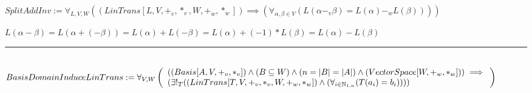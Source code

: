 \documentclass{book}
\newcommand{\abr}{:=}
\begin{document}
$SplitAddInv \abr \forall_{L, V, W}((LinTrans[L, V, +_v, *_v, W, +_w, *_w]) \implies (\forall_{\alpha, \beta \in V}(L(\alpha -_v \beta) = L(\alpha) -_w L(\beta))))$
\begin{enumerate}
  \lit $L(\alpha - \beta) = L(\alpha + (-\beta)) = L(\alpha) + L(-\beta) = L(\alpha) + (-1) * L(\beta) = L(\alpha) - L(\beta)$
\end{enumerate} \vspace{.75mm} \hrule \vspace{.75mm} \ \\ 

$BasisDomainInduceLinTrans \abr \forall_{V, W}\left(\begin{array}{ll}
  ((Basis[A, V, +_v, *_v]) \land (B \subseteq W) \land (n = |B| = |A|) \land (VectorSpace[W, +_w, *_w])) \hfill \implies \hfill \\
  (\exists!_{T}((LinTrans[T, V, +_v, *_v, W, +_w, *_w]) \land (\forall_{i \in \mathbb{N}_{1, n}}(T(a_i) = b_i))))
\end{array}\right)$
\end{document}

